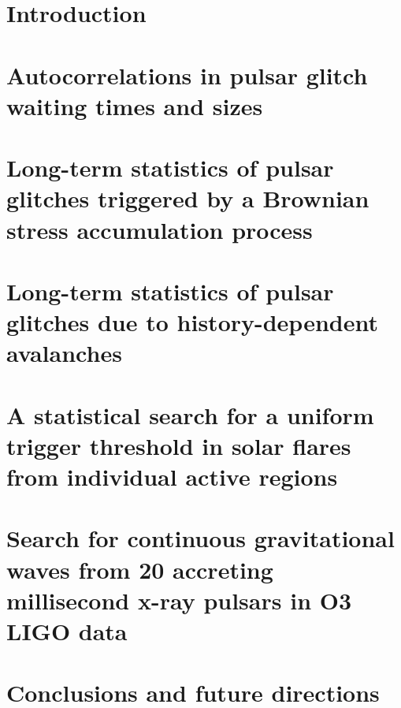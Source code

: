 \documentclass[School=Unimelb]{Dissertate}
\begin{document}
  \graphicspath{{./figures/}}
  
  \frontmatter


  \chapter{Introduction}
  \label{chap:intro}
  

  \chapter{Autocorrelations in pulsar glitch waiting times and sizes}
  \label{chap:acorr}
  

  \chapter{Long-term statistics of pulsar glitches triggered by a Brownian stress accumulation process}
  \label{chap:bsa}
  
  
  \chapter[Long-term statistics of pulsar glitches due to history-dependent \linebreak avalanches]{Long-term statistics of pulsar glitches due to history-dependent avalanches}
  \label{chap:hda}
  

  \chapter{A statistical search for a uniform trigger threshold in solar flares from individual active regions}
  \label{chap:sf}
  

  \chapter{Search for continuous gravitational waves from 20 accreting millisecond x-ray pulsars in O3 LIGO data}
  \label{chap:amxp}
  

  \chapter{Conclusions and future directions}
  \label{chap:conc}
  

  \clearpage
  \printbibliography
\end{document}
